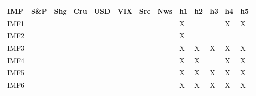 {\tiny\setlength{\tabcolsep}{1pt}\begin{tabular}{lllllllllllll} \toprule
IMF & S\&P & Shg & Cru & USD & VIX & Src & Nws & h1 & h2 & h3 & h4 & h5 \\ \midrule
IMF1 & & & & & & & & X & & & X & X \\ 
IMF2 & & & & & & & & X & & & & \\ 
IMF3 & & & & & & & & X & X & X & X & X \\ 
IMF4 & & & & & & & & X & X & & X & X \\ 
IMF5 & & & & & & & & X & X & X & X & X \\ 
IMF6 & & & & & & & & X & X & X & X & X \\ 
\bottomrule \end{tabular}}